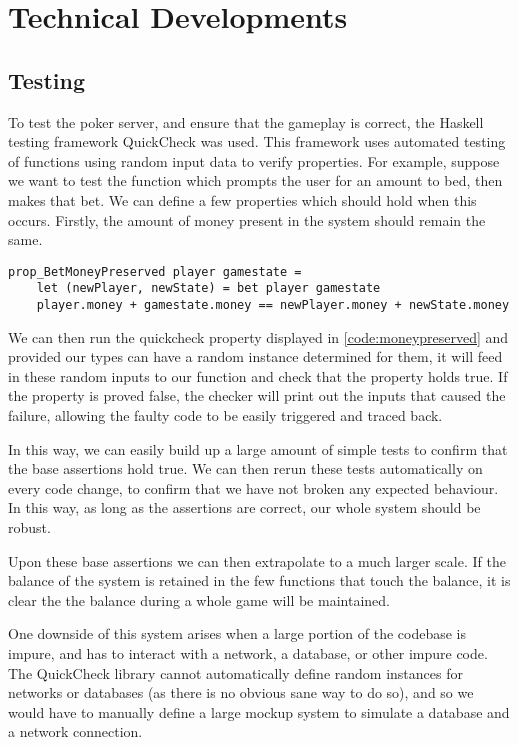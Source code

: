 \section{Technical Developments}

\subsection{Testing}
To test the poker server, and ensure that the gameplay is correct, the
Haskell testing framework QuickCheck\cite{claessen2000} was used. This
framework uses automated testing of functions using random input data to
verify properties. For example, suppose we want to test the function which
prompts the user for an amount to bed, then makes that bet. We can define a
few properties which should hold when this occurs.
Firstly, the amount of money present in the system should remain the same.

\begin{lstlisting}
prop_BetMoneyPreserved player gamestate =
    let (newPlayer, newState) = bet player gamestate
    player.money + gamestate.money == newPlayer.money + newState.money
\end{lstlisting}
\label{code:moneypreserved}

We can then run the quickcheck property displayed in \ref{code:moneypreserved}
and provided our types can have a random instance determined for them, it
will feed in these random inputs to our function and check that the property
holds true. If the property is proved false, the checker will print out the
inputs that caused the failure, allowing the faulty code to be easily triggered
and traced back.

In this way, we can easily build up a large amount of simple tests to confirm
that the base assertions hold true. We can then rerun these tests automatically
on every code change, to confirm that we have not broken any expected
behaviour. In this way, as long as the assertions are correct, our whole
system should be robust.

Upon these base assertions we can then extrapolate to a much larger scale.
If the balance of the system is retained in the few functions that touch
the balance, it is clear the the balance during a whole game will be maintained.

One downside of this system arises when a large portion of the codebase is
impure, and has to interact with a network, a database, or other impure code.
The QuickCheck library cannot automatically define random instances for
networks or databases (as there is no obvious sane way to do so), and so we
would have to manually define a large mockup system to simulate a database
and a network connection.


